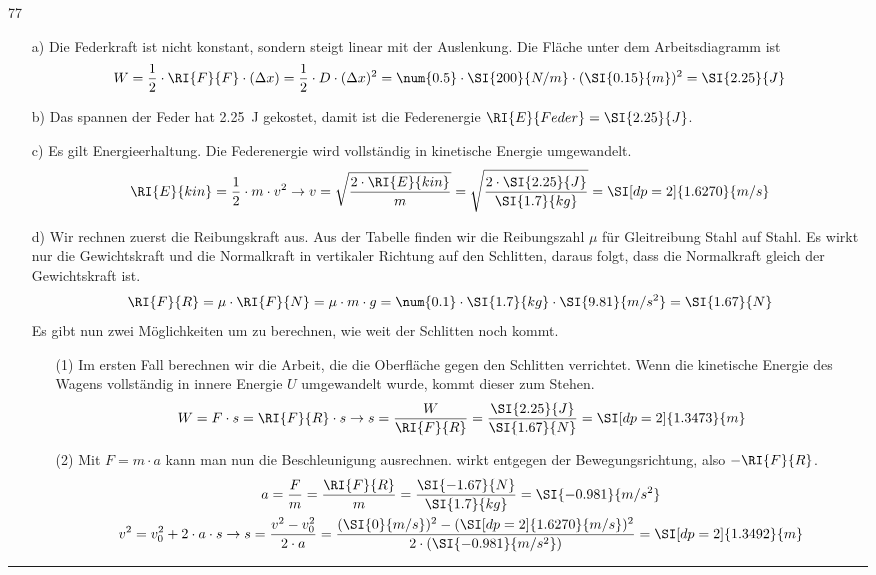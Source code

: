 \documentclass[12pt,a4paper,twoside]{article}
\begin{document}
\begin{ex@loesung}{77}
\begin{itemize}
\item [a)] Die Federkraft ist nicht konstant, sondern steigt linear mit der Auslenkung.
Die Fläche unter dem Arbeitsdiagramm ist
\begin{eqnarray*}
W=\frac{1}{2}\cdot\RI{F}{F}\cdot(\Delta x)=\frac{1}{2}\cdot D\cdot (\Delta x)^2=\num{0.5}\cdot\SI{200}{N/m}\cdot(\SI{0.15}{m})^2=\SI{2.25}{J}
\end{eqnarray*}
\item[b)] Das spannen der Feder hat \SI{2.25}{J} gekostet, damit ist die Federenergie $\RI{E}{Feder}=\SI{2.25}{J}$.
\item[c)] Es gilt Energieerhaltung. Die Federenergie wird vollständig in kinetische Energie umgewandelt.
\begin{eqnarray*}
\RI{E}{kin}=\frac{1}{2}\cdot m\cdot v^2 \to v=\sqrt{\frac{2\cdot \RI{E}{kin}}{m}} =\sqrt{\frac{2\cdot\SI{2.25}{J}}{\SI{1.7}{kg}}}=\SI[dp=2]{1.6270}{m/s}
\end{eqnarray*}
\item[d)] Wir rechnen zuerst die Reibungskraft aus. Aus der Tabelle finden wir die Reibungszahl $\mu$ für Gleitreibung Stahl auf Stahl.
Es wirkt nur die Gewichtskraft und die Normalkraft in vertikaler Richtung auf den Schlitten,
daraus folgt, dass die Normalkraft gleich
der Gewichtskraft ist.
\begin{eqnarray*}
\RI{F}{R}=\mu\cdot\RI{F}{N}=\mu\cdot m\cdot g=\num{0.1}\cdot\SI{1.7}{kg}\cdot\SI{9.81}{m/s^2}=\SI{1.67}{N}
\end{eqnarray*}
Es gibt nun zwei Möglichkeiten um zu berechnen, wie weit der Schlitten noch kommt.
\begin{itemize}
\item [(1)] Im ersten Fall berechnen wir die Arbeit, die die Oberfläche gegen den Schlitten verrichtet.
Wenn die kinetische Energie des Wagens vollständig in innere Energie $U$ umgewandelt wurde, kommt dieser zum Stehen.
\begin{eqnarray*}
W=F\cdot s =\RI{F}{R}\cdot s \to s =\frac{W}{\RI{F}{R}}=\frac{\SI{2.25}{J}}{\SI{1.67}{N}}=\SI[dp=2]{1.3473}{m}
\end{eqnarray*}
\item[(2)]
Mit $F=m\cdot a$ kann man nun die Beschleunigung ausrechnen.  wirkt entgegen der Bewegungsrichtung, also $-\RI{F}{R}$.
\begin{gather*}
a=\frac{F}{m} =\frac{\RI{F}{R}}{m}=\frac{\SI{-1.67}{N}}{\SI{1.7}{kg}}=\SI{-0.981}{m/s^2}\\
v^2=v_0^2+2\cdot a\cdot s \to s=\frac{v^2-v_0^2}{2\cdot a}=\frac{(\SI{0}{m/s})^2-(\SI[dp=2]{1.6270}{m/s})^2}{2\cdot(\SI{-0.981}{m/s^2})}=\SI[dp=2]{1.3492}{m}
\end{gather*}

\end{itemize}
\end{itemize}
\hrule \end{ex@loesung}
\end{document}
